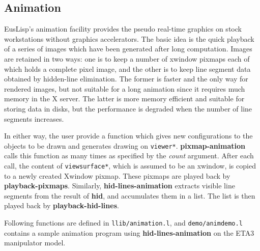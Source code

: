 \subsection{Animation}
EusLisp's animation facility provides the pseudo real-time
graphics on stock workstations without graphics accelerators.
The basic idea is the quick playback of a series of images which have been
generated after long computation.
Images are retained in two ways:
one is to keep a number of xwindow pixmaps each of which holds a complete
pixel image, and the other is to keep line segment data obtained by
hidden-line elimination.
The former is faster and the only way for rendered images,
but not suitable for a long animation since it requires much memory
in the X server.
The latter is more memory efficient and suitable for storing data in disks,
but the performance is degraded
when the number of line segments increases.

In either way, the user provide a function which gives new configurations
to the objects to be drawn and generates drawing on {\tt *viewer*}.
{\bf pixmap-animation} calls this function as many times as
specified by the {\em count} argument.
After each call, the content of {\tt *viewsurface*}, which is assumed to
be an xwindow, is copied to a newly created Xwindow pixmap.
These pixmaps are played back by {\bf playback-pixmaps}.
Similarly, {\bf hid-lines-animation} extracts visible line segments
from the result of {\bf hid}, and accumulates them in a list.
The list is then played back by {\bf playback-hid-lines}.

Following functions are defined in {\tt llib/animation.l}, and
{\tt demo/animdemo.l} contains a sample animation program
using {\bf hid-lines-animation} on the ETA3 manipulator model.

\begin{refdesc}



\end{refdesc}

\newpage
